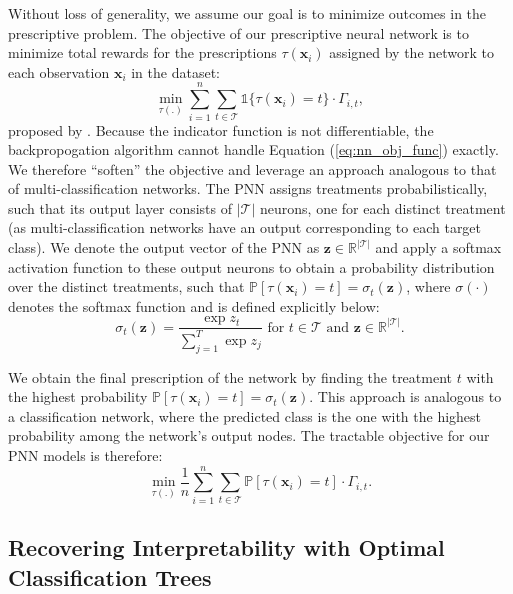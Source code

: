 \documentclass[10pt]{article} %
\begin{document}
Without loss of generality, we assume our goal is to minimize outcomes in the prescriptive problem. The objective of our prescriptive neural network is to minimize total rewards for the prescriptions $\tau(\boldsymbol{x}_i)$ assigned by the network to each observation $\boldsymbol{x}_i$ in the dataset: 
\begin{equation}\label{eq:nn_obj_func}
    \min_{\tau(.)} \sum_{i=1}^{n} \sum_{t\in\mathcal{T}}\mathbb{1} \{\tau(\boldsymbol{x}_i) = t\}\cdot \Gamma_{i,t}, 
\end{equation}
proposed by \citet{optimal-policy-trees}. Because the indicator function is not differentiable, the backpropogation algorithm cannot handle Equation (\ref{eq:nn_obj_func}) exactly. We therefore ``soften'' the objective and leverage an approach analogous to that of multi-classification networks. The PNN assigns treatments probabilistically, such that its output layer consists of $|\mathcal{T}|$ neurons, one for each distinct treatment (as multi-classification networks have an output corresponding to each target class). We denote the output vector of the PNN as $\boldsymbol{z}\in\mathbb{R}^{|\mathcal{T}|}$ and apply a softmax activation function to these output neurons to obtain a probability distribution over the distinct treatments, such that $\mathbb{P}[\tau(\boldsymbol{x}_i) = t] = \sigma_t(\boldsymbol{z})$, where $\sigma(\cdot)$ denotes the softmax function and is defined explicitly below:  
\begin{equation}
    \sigma_t(\boldsymbol{z})= \frac{\exp{z_{t}}}{\sum_{j=1}^{T} \exp{z_{j}}} \text{ for $t\in\mathcal{T}$ and $\boldsymbol{z} \in \mathbb{R}^{|\mathcal{T}|}$}.
\label{eq:softmax}
\end{equation}

We obtain the final prescription of the network by finding the treatment $t$ with the highest probability $\mathbb{P}[\tau(\boldsymbol{x}_i) = t] = \sigma_t(\boldsymbol{z})$. This approach is analogous to a classification network, where the predicted class is the one with the highest probability among the network's output nodes. The tractable objective for our PNN models is therefore:
\begin{equation}
    \min_{\tau(.)} \frac{1}{n} \sum_{i=1}^{n} \sum_{t\in\mathcal{T}} \mathbb{P}[\tau(\boldsymbol{x}_i) = t] \cdot \Gamma_{i,t}.
\label{eq:prob_loss_func}
\end{equation}

\subsection{Recovering Interpretability with Optimal Classification Trees}\label{subsec:oct-pnn}
\end{document}

